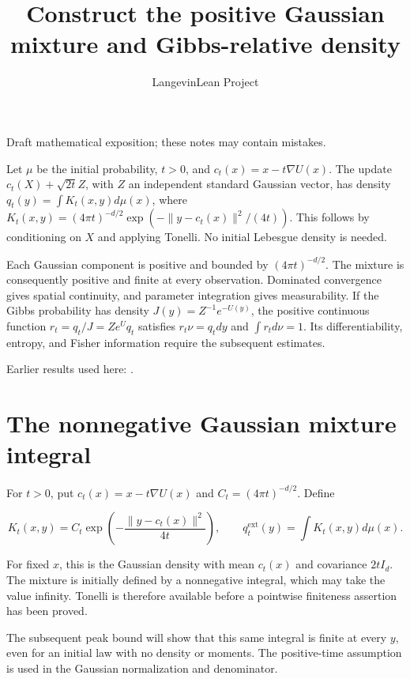 \documentclass[11pt,a4paper]{article}
\title{\texorpdfstring{Construct the positive Gaussian mixture and Gibbs-relative density}{Construct the positive Gaussian mixture and Gibbs-relative density}}
\author{LangevinLean Project}
\date{}
\begin{document}
\maketitle
Draft mathematical exposition; these notes may contain mistakes.


Let \(\mu\) be the initial probability, \(t>0\), and \(c_t(x)=x-t\nabla U(x)\). The update \(c_t(X)+\sqrt{2t}Z\), with \(Z\) an independent standard Gaussian vector, has density \(q_t(y)=\int K_t(x,y)d\mu(x)\), where \(K_t(x,y)=(4\pi t)^{-d/2}\exp(-\|y-c_t(x)\|^2/(4t))\). This follows by conditioning on \(X\) and applying Tonelli. No initial Lebesgue density is needed.



Each Gaussian component is positive and bounded by \((4\pi t)^{-d/2}\). The mixture is consequently positive and finite at every observation. Dominated convergence gives spatial continuity, and parameter integration gives measurability. If the Gibbs probability has density \(J(y)=Z^{-1}e^{-U(y)}\), the positive continuous function \(r_t=q_t/J=Ze^Uq_t\) satisfies \(r_t\nu=q_tdy\) and \(\int r_td\nu=1\). Its differentiability, entropy, and Fisher information require the subsequent estimates.



Earlier results used here: \cite[Section~3.37]{LangevinLean2026ULASC}.

\section{\texorpdfstring{The nonnegative Gaussian mixture integral}{The nonnegative Gaussian mixture integral}}


For \(t>0\), put \(c_t(x)=x-t\nabla U(x)\) and \(C_t=(4\pi t)^{-d/2}\). Define

\[K_t(x,y)=C_t\exp\!\left(-\frac{\|y-c_t(x)\|^2}{4t}\right),\qquad q_t^{\mathrm{ext}}(y)=\int K_t(x,y)d\mu(x).\]

For fixed \(x\), this is the Gaussian density with mean \(c_t(x)\) and covariance \(2tI_d\). The mixture is initially defined by a nonnegative integral, which may take the value infinity. Tonelli is therefore available before a pointwise finiteness assertion has been proved.



The subsequent peak bound will show that this same integral is finite at every \(y\), even for an initial law with no density or moments. The positive-time assumption is used in the Gaussian normalization and denominator.
\end{document}
